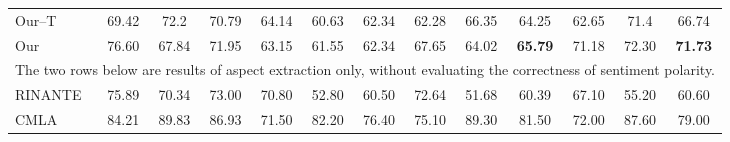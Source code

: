 \documentclass[letterpaper]{article} \usepackage{aaai20}  \usepackage{times}  \usepackage{helvet} \usepackage{courier}  \usepackage[hyphens]{url}  \usepackage{graphicx} \urlstyle{rm} \def\UrlFont{\rm}  \usepackage{graphicx}  \frenchspacing  \setlength{\pdfpagewidth}{8.5in}  \setlength{\pdfpageheight}{11in}
\begin{document}
\begin{table*}[t]
\begin{small}
\begin{tabular}{l|ccc|ccc|ccc|ccc}
Our--T       				           & 69.42 & 72.2          & 70.79          & 64.14          & 60.63          & 62.34         & 62.28         & 66.35         & 64.25         & 62.65          & 71.4         & 66.74         \\
Our                                & 76.60          & 67.84 & 71.95 & 63.15          & 61.55 & 62.34 & 67.65 & 64.02          & \textbf{65.79} & 71.18 & 72.30  & \textbf{71.73} \\ \hline\hline
\multicolumn{13}{c}{The two rows below are results of aspect extraction only, without evaluating the correctness of sentiment polarity.} \\\hline
\rowcolor{Gray}
RINANTE                            & 75.89          & 70.34          & 73.00          & 70.80          & 52.80          & 60.50          & 72.64          & 51.68          & 60.39          & 67.10          & 55.20          & 60.60          \\
\rowcolor{Gray}
CMLA                               & 84.21		          & 89.83          & 86.93          & 71.50		          & 82.20          & 76.40          & 75.10		          & 89.30          & 81.50          & 72.00		          & 87.60          & 79.00          \\ \hline
\end{tabular}
\end{small}
\end{table*}
\end{document}
